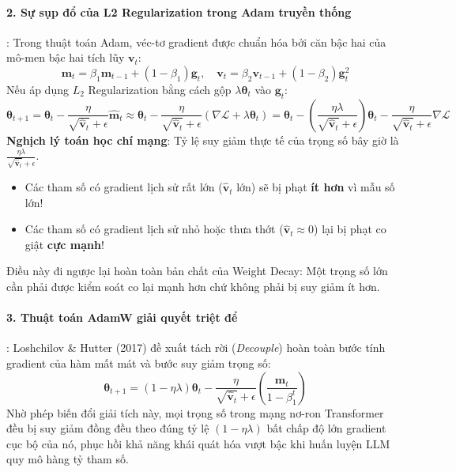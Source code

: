 \paragraph{2. Sự sụp đổ của L2 Regularization trong Adam truyền thống}:
Trong thuật toán Adam, véc-tơ gradient được chuẩn hóa bởi căn bậc hai của mô-men bậc hai tích lũy $\mathbf{v}_t$:
\begin{equation}
\mathbf{m}_t = \beta_1 \mathbf{m}_{t-1} + (1 - \beta_1) \mathbf{g}_t, \quad \mathbf{v}_t = \beta_2 \mathbf{v}_{t-1} + (1 - \beta_2) \mathbf{g}_t^2
\end{equation}
Nếu áp dụng $L_2$ Regularization bằng cách gộp $\lambda \boldsymbol{\theta}_t$ vào $\mathbf{g}_t$:
\begin{equation}
\boldsymbol{\theta}_{t+1} = \boldsymbol{\theta}_t - \frac{\eta}{\sqrt{\hat{\mathbf{v}}_t} + \epsilon} \hat{\mathbf{m}}_t \approx \boldsymbol{\theta}_t - \frac{\eta}{\sqrt{\hat{\mathbf{v}}_t} + \epsilon} \left( \nabla \mathcal{L} + \lambda \boldsymbol{\theta}_t \right) = \boldsymbol{\theta}_t - \left( \frac{\eta \lambda}{\sqrt{\hat{\mathbf{v}}_t} + \epsilon} \right) \boldsymbol{\theta}_t - \frac{\eta}{\sqrt{\hat{\mathbf{v}}_t} + \epsilon} \nabla \mathcal{L}
\end{equation}
\textbf{Nghịch lý toán học chí mạng}:
Tỷ lệ suy giảm thực tế của trọng số bây giờ là $\frac{\eta \lambda}{\sqrt{\hat{\mathbf{v}}_t} + \epsilon}$.
\begin{itemize}
  \item Các tham số có gradient lịch sử rất lớn ($\hat{\mathbf{v}}_t$ lớn) sẽ bị phạt \textbf{ít hơn} vì mẫu số lớn!
  \item Các tham số có gradient lịch sử nhỏ hoặc thưa thớt ($\hat{\mathbf{v}}_t \approx 0$) lại bị phạt co giật \textbf{cực mạnh}!
\end{itemize}
Điều này đi ngược lại hoàn toàn bản chất của Weight Decay: Một trọng số lớn cần phải được kiểm soát co lại mạnh hơn chứ không phải bị suy giảm ít hơn.

\paragraph{3. Thuật toán AdamW giải quyết triệt để}:
Loshchilov \& Hutter (2017) đề xuất tách rời (\textit{Decouple}) hoàn toàn bước tính gradient của hàm mất mát và bước suy giảm trọng số:
\begin{equation}
\boldsymbol{\theta}_{t+1} = (1 - \eta \lambda) \boldsymbol{\theta}_t - \frac{\eta}{\sqrt{\hat{\mathbf{v}}_t} + \epsilon} \left( \frac{\mathbf{m}_t}{1 - \beta_1^t} \right)
\end{equation}
Nhờ phép biến đổi giải tích này, mọi trọng số trong mạng nơ-ron Transformer đều bị suy giảm đồng đều theo đúng tỷ lệ $(1 - \eta \lambda)$ bất chấp độ lớn gradient cục bộ của nó, phục hồi khả năng khái quát hóa vượt bậc khi huấn luyện LLM quy mô hàng tỷ tham số.

